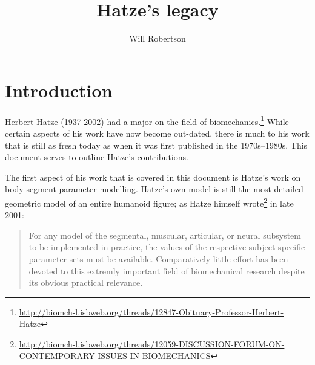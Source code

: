 \documentclass[a4paper]{article}
\begin{document}
\title{Hatze's legacy}
\author{Will Robertson}
\maketitle

\section{Introduction}

Herbert Hatze (1937-2002) had a major on the field of biomechanics.\footnote{\url{http://biomch-l.isbweb.org/threads/12847-Obituary-Professor-Herbert-Hatze}}
While certain aspects of his work have now become out-dated, there is much to his work that is still as fresh today as when it was first published in the 1970s--1980s.
This document serves to outline Hatze's contributions.

The first aspect of his work that is covered in this document is Hatze's work on body segment parameter modelling.
Hatze's own model \parencite{hatze1979-techreport} is still the most detailed geometric model of an entire humanoid figure; as Hatze himself wrote\footnote{\url{http://biomch-l.isbweb.org/threads/12059-DISCUSSION-FORUM-ON-CONTEMPORARY-ISSUES-IN-BIOMECHANICS}} in late 2001:
\begin{quote}
For any model of the segmental, muscular, articular, or neural subsystem
to be implemented in practice, the values of the respective
subject-specific parameter sets must be available.
Comparatively little
effort has been devoted to this extremly important field of
biomechanical research despite its obvious practical relevance.
\end{quote}

\printbibliography
\end{document}

